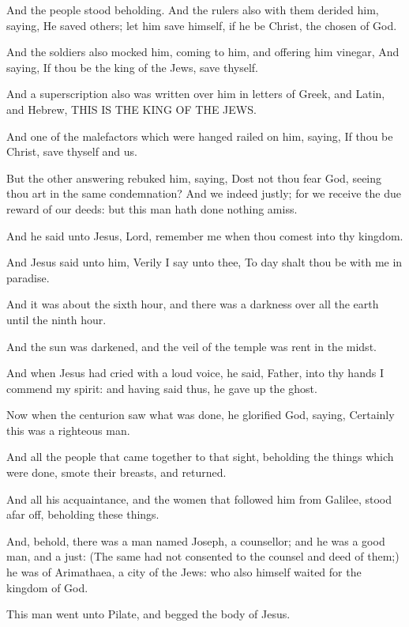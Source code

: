 \verse And the people stood beholding. And the rulers also with them derided him, saying, He saved others; let him save himself, if he be Christ, the chosen of God.

\verse And the soldiers also mocked him, coming to him, and offering him vinegar, \verse And saying, If thou be the king of the Jews, save thyself.

\verse And a superscription also was written over him in letters of Greek, and Latin, and Hebrew, THIS IS THE KING OF THE JEWS.

\verse And one of the malefactors which were hanged railed on him, saying, If thou be Christ, save thyself and us.

\verse But the other answering rebuked him, saying, Dost not thou fear God, seeing thou art in the same condemnation?  \verse And we indeed justly; for we receive the due reward of our deeds: but this man hath done nothing amiss.

\verse And he said unto Jesus, Lord, remember me when thou comest into thy kingdom.

\verse And Jesus said unto him, Verily I say unto thee, To day shalt thou be with me in paradise.

\verse And it was about the sixth hour, and there was a darkness over all the earth until the ninth hour.

\verse And the sun was darkened, and the veil of the temple was rent in the midst.

\verse And when Jesus had cried with a loud voice, he said, Father, into thy hands I commend my spirit: and having said thus, he gave up the ghost.

\verse Now when the centurion saw what was done, he glorified God, saying, Certainly this was a righteous man.

\verse And all the people that came together to that sight, beholding the things which were done, smote their breasts, and returned.

\verse And all his acquaintance, and the women that followed him from Galilee, stood afar off, beholding these things.

\verse And, behold, there was a man named Joseph, a counsellor; and he was a good man, and a just: \verse (The same had not consented to the counsel and deed of them;) he was of Arimathaea, a city of the Jews: who also himself waited for the kingdom of God.

\verse This man went unto Pilate, and begged the body of Jesus.

